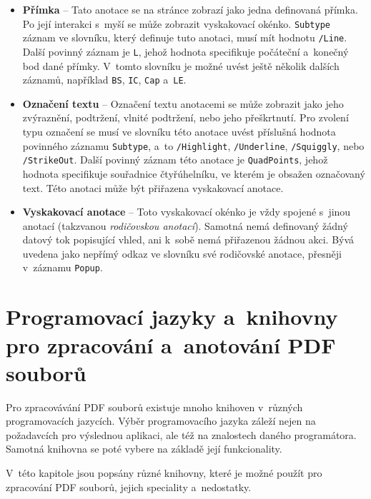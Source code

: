 \begin{itemize}
    \item \textbf{Přímka} -- Tato anotace se na stránce zobrazí
    jako jedna definovaná přímka. Po její interakci s~myší se
    může zobrazit vyskakovací okénko. \texttt{Subtype} záznam ve slovníku, který
    definuje tuto anotaci, musí mít hodnotu \texttt{/Line}. Další
    povinný záznam je \texttt{L}, jehož hodnota specifikuje počáteční 
    a~konečný bod dané přímky. V~tomto slovníku je možné uvést
    ještě několik dalších záznamů, například \texttt{BS}, \texttt{IC},
    \texttt{Cap} a~\texttt{LE}.
    
    \item \textbf{Označení textu} -- Označení textu anotacemi se může zobrazit
    jako jeho zvýraznění, podtržení, vlnité podtržení, nebo jeho přeškrtnutí.
    Pro zvolení typu označení se musí ve slovníku této anotace uvést příslušná
    hodnota povinného záznamu \texttt{Subtype}, a~to \texttt{/Highlight},
    \texttt{/Underline}, \texttt{/Squiggly}, nebo \texttt{/StrikeOut}.
    Další povinný záznam této anotace je \texttt{QuadPoints}, jehož hodnota
    specifikuje souřadnice čtyřúhelníku, ve kterém je obsažen označovaný text.
    Této anotaci může být přiřazena vyskakovací anotace.
    
    \item \textbf{Vyskakovací anotace} -- Toto vyskakovací okénko je vždy spojené
    s~jinou anotací (takzvanou \emph{rodičovskou anotací}). Samotná nemá
    definovaný žádný datový tok popisující vhled, ani k~sobě nemá přiřazenou
    žádnou akci. Bývá uvedena jako nepřímý odkaz ve slovníku své rodičovské
    anotace, přesněji v~záznamu \texttt{Popup}.
\end{itemize}



\section{Programovací jazyky a~knihovny pro zpracování a~anotování PDF souborů}

Pro zpracovávání PDF souborů existuje mnoho knihoven v~různých programovacích
jazycích. Výběr programovacího jazyka záleží nejen na požadavcích pro výslednou
aplikaci, ale též na znalostech daného programátora. Samotná knihovna se poté
vybere na základě její funkcionality. 

V~této kapitole jsou popsány různé knihovny, které je možné použít pro zpracování
PDF souborů, jejich speciality a~nedostatky.


